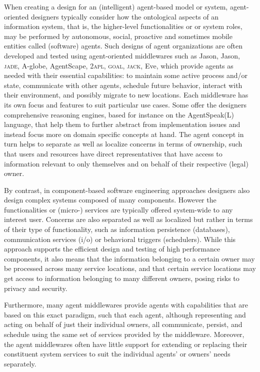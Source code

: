 \documentclass{aamas2015}
\begin{document}
When creating a design for an (intelligent) agent-based model or system,
agent-oriented designers typically consider how the ontological aspects of an
information system, that is, the higher-level functionalities or or system
roles, may be performed by autonomous, social, proactive and sometimes mobile
entities called (software) agents. Such designs of agent organizations are often
developed and tested using agent-oriented middlewares such as Jason, Jason,
\textsc{jade}, A-globe, AgentScape, \textsc{2apl}, \textsc{goal}, \textsc{jack},
Eve, which provide agents as needed with their essential capabilities: to
maintain some active process and/or state, communicate with other agents,
schedule future behavior, interact with their environment, and possibly migrate
to new locations. Each middleware has its own focus and features to suit
particular use cases. Some offer the designers comprehensive reasoning engines,
based for instance on the AgentSpeak(L) language, that help them to further
abstract from implementation issues and instead focus more on domain specific
concepts at hand. The agent concept in turn helps to separate as well as
localize concerns in terms of ownership, such that users and resources have
direct representatives that have access to information relevant to
only themselves and on behalf of their respective (legal) owner.

By contrast, in component-based software engineering approaches designers also
design complex systems composed of many components. However the functionalities
or (micro-) services are typically offered system-wide to any interest user.
Concerns are also separated as well as localized but rather in terms of their type of
functionality, such as information persistence (databases), communication services (i/o) or behavioral
triggers (schedulers). While this approach supports the efficient design and
testing of high performance components, it also means that the information
belonging to a certain owner may be processed across many service locations,
and that certain service locations may get access to information belonging to
many different owners, posing risks to privacy and security.

Furthermore, many agent middlewares provide agents with
capabilities that are based on this exact paradigm, such that each agent,
although representing and acting on behalf of just their individual owners,
all communicate, persist, and schedule using the same set of services
provided by the middleware. Moreover, the agent middlewares
often have little support for extending or replacing their constituent system services to suit the individual agents' or owners' needs separately.
\end{document}

